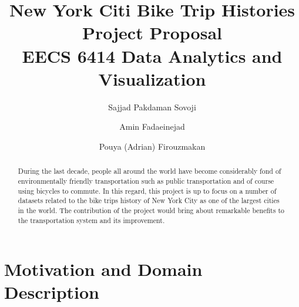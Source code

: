 \documentclass[sigconf,authordraft]{acmart}
\begin{document}
\title{New York Citi Bike Trip Histories\\
\large Project Proposal\\
EECS 6414 Data Analytics and Visualization}

\author{Sajjad Pakdaman Sovoji}

\author{Amin Fadaeinejad}

\author{Pouya (Adrian) Firouzmakan}


\begin{abstract}
During the last decade, people all around the world have become considerably fond of environmentally friendly transportation such as public transportation and of course using bicycles to commute. In this regard, this project is up to focus on a number of datasets related to the bike trips history of New York City as one of the largest cities in the world. The contribution of the project would bring about remarkable benefits to the transportation system and its improvement.
\end{abstract}





\maketitle

\section{Motivation and Domain Description}
\end{document}
